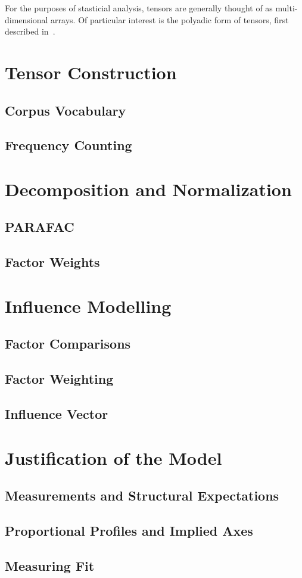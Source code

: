 \documentclass[../ut-dissertation.tex]{subfiles}
\begin{document}
For the purposes of stasticial analysis, tensors are generally thought
of as multi-dimensional arrays. Of particular interest is the polyadic
form of tensors, first described in~\cite{hitchcock1927}. 
\section{Tensor Construction}
\subsection{Corpus Vocabulary}
\subsection{Frequency Counting}

\section{Decomposition and Normalization}
\subsection{PARAFAC}
\subsection{Factor Weights}

\section{Influence Modelling}
\subsection{Factor Comparisons}
\subsection{Factor Weighting}
\subsection{Influence Vector}

\section{Justification of the Model}
\subsection{Measurements and Structural Expectations}
\subsection{Proportional Profiles and Implied Axes}
\subsection{Measuring Fit}
\end{document}
